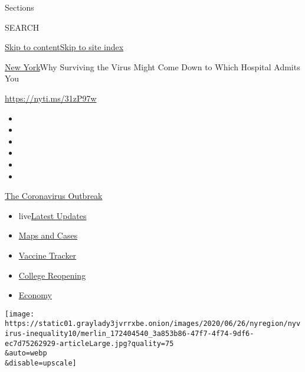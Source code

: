 Sections

SEARCH

\protect\hyperlink{site-content}{Skip to
content}\protect\hyperlink{site-index}{Skip to site index}

\href{/section/nyregion}{New York}\textbar{}Why Surviving the Virus
Might Come Down to Which Hospital Admits You

\href{https://nyti.ms/31zP97w}{https://nyti.ms/31zP97w}

\begin{itemize}
\item
\item
\item
\item
\item
\item
\end{itemize}

\href{https://www.nytimes3xbfgragh.onion/news-event/coronavirus?action=click\&pgtype=Article\&state=default\&region=TOP_BANNER\&context=storylines_menu}{The
Coronavirus Outbreak}

\begin{itemize}
\tightlist
\item
  live\href{https://www.nytimes3xbfgragh.onion/2020/08/04/world/coronavirus-cases.html?action=click\&pgtype=Article\&state=default\&region=TOP_BANNER\&context=storylines_menu}{Latest
  Updates}
\item
  \href{https://www.nytimes3xbfgragh.onion/interactive/2020/us/coronavirus-us-cases.html?action=click\&pgtype=Article\&state=default\&region=TOP_BANNER\&context=storylines_menu}{Maps
  and Cases}
\item
  \href{https://www.nytimes3xbfgragh.onion/interactive/2020/science/coronavirus-vaccine-tracker.html?action=click\&pgtype=Article\&state=default\&region=TOP_BANNER\&context=storylines_menu}{Vaccine
  Tracker}
\item
  \href{https://www.nytimes3xbfgragh.onion/2020/08/02/us/covid-college-reopening.html?action=click\&pgtype=Article\&state=default\&region=TOP_BANNER\&context=storylines_menu}{College
  Reopening}
\item
  \href{https://www.nytimes3xbfgragh.onion/live/2020/08/04/business/stock-market-today-coronavirus?action=click\&pgtype=Article\&state=default\&region=TOP_BANNER\&context=storylines_menu}{Economy}
\end{itemize}

\texttt{[image: https://static01.graylady3jvrrxbe.onion/images/2020/06/26/nyregion/nyvirus-inequality10/merlin\_172404540\_3a853b86-47f7-4f74-9df6-ec7d75262929-articleLarge.jpg?quality=75\\\&auto=webp\\\&disable=upscale]}

